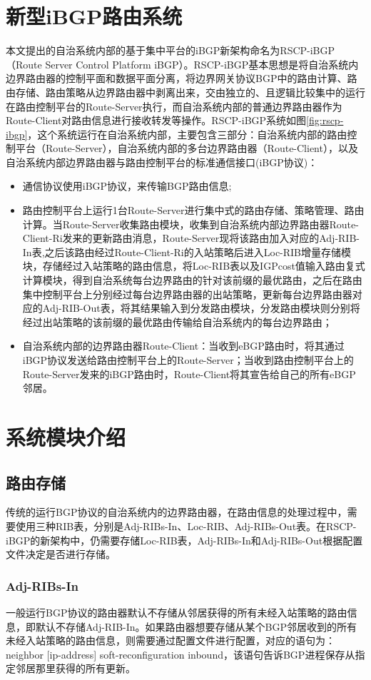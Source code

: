 \section{新型iBGP路由系统}
本文提出的自治系统内部的基于集中平台的iBGP新架构命名为RSCP-iBGP（Route Server Control Platform iBGP）。RSCP-iBGP基本思想是将自治系统内边界路由器的控制平面和数据平面分离，将边界网关协议BGP中的路由计算、路由存储、路由策略从边界路由器中剥离出来，交由独立的、且逻辑比较集中的运行在路由控制平台的Route-Server执行，而自治系统内部的普通边界路由器作为Route-Client对路由信息进行接收转发等操作。RSCP-iBGP系统如图\ref{fig:rscp-ibgp}，这个系统运行在自治系统内部，主要包含三部分：自治系统内部的路由控制平台（Route-Server），自治系统内部的多台边界路由器（Route-Client），以及自治系统内部边界路由器与路由控制平台的标准通信接口(iBGP协议)：
\begin{itemize}
  \item 通信协议使用iBGP协议，来传输BGP路由信息;
  \item 路由控制平台上运行1台Route-Server进行集中式的路由存储、策略管理、路由计算。当Route-Server收集路由模块，收集到自治系统内部边界路由器Route-Client-Ri发来的更新路由消息，Route-Server现将该路由加入对应的Adj-RIB-In表,之后该路由经过Route-Client-Ri的入站策略后进入Loc-RIB增量存储模块，存储经过入站策略的路由信息，将Loc-RIB表以及IGPcost值输入路由复式计算模块，得到自治系统每台边界路由的针对该前缀的最优路由，之后在路由集中控制平台上分别经过每台边界路由器的出站策略，更新每台边界路由器对应的Adj-RIB-Out表，将其结果输入到分发路由模块，分发路由模块则分别将经过出站策略的该前缀的最优路由传输给自治系统内的每台边界路由；
  \item 自治系统内部的边界路由器Route-Client：当收到eBGP路由时，将其通过iBGP协议发送给路由控制平台上的Route-Server；当收到路由控制平台上的Route-Server发来的iBGP路由时，Route-Client将其宣告给自己的所有eBGP邻居。
\end{itemize}

\section{系统模块介绍}
\subsection{路由存储}
传统的运行BGP协议的自治系统内的边界路由器，在路由信息的处理过程中，需要使用三种RIB表，分别是Adj-RIBs-In、Loc-RIB、Adj-RIBs-Out表。在RSCP-iBGP的新架构中，仍需要存储Loc-RIB表，Adj-RIBs-In和Adj-RIBs-Out根据配置文件决定是否进行存储。
\subsubsection{Adj-RIBs-In}
一般运行BGP协议的路由器默认不存储从邻居获得的所有未经入站策略的路由信息，即默认不存储Adj-RIB-In。如果路由器想要存储从某个BGP邻居收到的所有未经入站策略的路由信息，则需要通过配置文件进行配置，对应的语句为：neighbor [ip-address] soft-reconfiguration inbound，该语句告诉BGP进程保存从指定邻居那里获得的所有更新。



